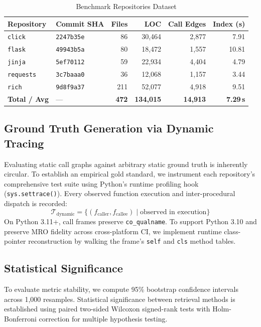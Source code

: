 \documentclass[conference]{IEEEtran}
\begin{document}
\begin{table}[htbp]
\caption{Benchmark Repositories Dataset}
\label{tab:repos}
\centering
\small
\begin{tabular}{llrrrr}
\toprule
\textbf{Repository} & \textbf{Commit SHA} & \textbf{Files} & \textbf{LOC} & \textbf{Call Edges} & \textbf{Index (s)} \\
\midrule
\texttt{click}     & \texttt{2247b35e} & 86  & 30,464  & 2,877  & 7.91 \\
\texttt{flask}     & \texttt{49943b5a} & 80  & 18,472  & 1,557  & 10.81 \\
\texttt{jinja}     & \texttt{5ef70112} & 59  & 22,934  & 4,404  & 4.79 \\
\texttt{requests}  & \texttt{3c7baaa0} & 36  & 12,068  & 1,157  & 3.44 \\
\texttt{rich}      & \texttt{9d8f9a37} & 211 & 52,077  & 4,918  & 9.51 \\
\midrule
\textbf{Total / Avg} & --- & \textbf{472} & \textbf{134,015} & \textbf{14,913} & \textbf{7.29\,s} \\
\bottomrule
\end{tabular}
\end{table}

\subsection{Ground Truth Generation via Dynamic Tracing}
Evaluating static call graphs against arbitrary static ground truth is inherently circular. To establish an empirical gold standard, we instrument each repository's comprehensive test suite using Python's runtime profiling hook (\texttt{sys.settrace()}). Every observed function execution and inter-procedural dispatch is recorded:
\begin{equation}
\mathcal{T}_{\text{dynamic}} = \{ (f_{\text{caller}}, f_{\text{callee}}) \mid \text{observed in execution} \}
\end{equation}
On Python 3.11+, call frames preserve \texttt{co\_qualname}. To support Python 3.10 and preserve MRO fidelity across cross-platform CI, we implement runtime class-pointer reconstruction by walking the frame's \texttt{self} and \texttt{cls} method tables.

\subsection{Statistical Significance}
To evaluate metric stability, we compute 95\% bootstrap confidence intervals across 1,000 resamples. Statistical significance between retrieval methods is established using paired two-sided Wilcoxon signed-rank tests with Holm-Bonferroni correction for multiple hypothesis testing.
\end{document}
